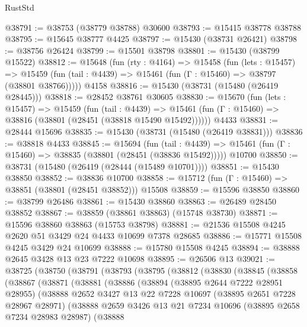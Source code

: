 \begin{lexlean}{RustStd}
\begin{coremodule}
@38791 := @38753 (@38779 @38788) @30600
@38793 := @15415 @38778 @38788
@38795 := @15645 @38777 @4425
@38797 := @15430 (@38731 @26421)
@38798 := @38756 @26424
@38799 := @15501 @38798
@38801 := @15430 (@38799 @15522)
@38812 := @15648
    (fun (rty : @4164) =>
    @15458
      (fun (lets : @15457) =>
      @15459 (fun (tail : @4439) => @15461 (fun (Γ : @15460) => @38797 (@38801 @38766)))))
    @4158
@38816 := @15430 (@38731 (@15480 (@26419 @28445)))
@38818 := @28452 @38761 @30605
@38830 := @15670
    (fun (lets : @15457) =>
    @15459
      (fun (tail : @4439) =>
      @15461 (fun (Γ : @15460) => @38816 (@38801 (@28451 (@38818 @15490 @15492))))))
    @4433
@38831 := @28444 @15696
@38835 := @15430 (@38731 (@15480 (@26419 @38831)))
@38836 := @38818 @4433
@38845 := @15694
    (fun (tail : @4439) => @15461 (fun (Γ : @15460) => @38835 (@38801 (@28451 (@38836 @15492)))))
    @10700
@38850 := @38731 (@15480 (@26419 (@28444 (@15489 @10701))))
@38851 := @15430 @38850
@38852 := @38836 @10700
@38858 := @15712 (fun (Γ : @15460) => @38851 (@38801 (@28451 @38852))) @15508
@38859 := @15596 @38850
@38860 := @38799 @26486
@38861 := @15430 @38860
@38863 := @26489 @28450 @38852
@38867 := @38859 (@38861 @38863) (@15748 @38730)
@38871 := @15596 @38860 @38863 (@15753 @38798)
@38881 := @21536 @15508 @4245 @2620 @51 @3429 @24 @4433 @10699 @7378 @28685
@38886 := @15771 @15508 @4245 @3429 @24 @10699
@38888 := @15780 @15508 @4245
@38894 := @38888 @2645 @3428 @13 @23 @7222 @10698
@38895 := @26506 @13
@39021 := @38725
    (@38750
      (@38791
        (@38793
          (@38795
            (@38812
              (@38830
                (@38845
                  (@38858
                    (@38867
                      (@38871
                        (@38881
                          (@38886
                            (@38894
                              (@38895 @2644 @7222 @28951 @28955)
                              (@38888
                                @2652
                                @3427
                                @13
                                @22
                                @7228
                                @10697
                                (@38895 @2651 @7228 @28967 @28971)
                                (@38888
                                  @2659
                                  @3426
                                  @13
                                  @21
                                  @7234
                                  @10696
                                  (@38895 @2658 @7234 @28983 @28987)
                                  (@38888

\end{coremodule}
\end{lexlean}
